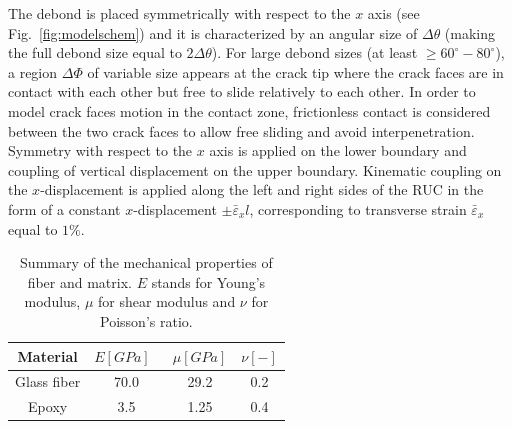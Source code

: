 \documentclass[review]{elsarticle}
\begin{document}
The debond is placed symmetrically with respect to the $x$ axis (see Fig.~\ref{fig:modelschem}) and it is characterized by an angular size of $\Delta\theta$ (making the full debond size equal to $2\Delta\theta$). For large debond sizes (at least $\geq 60^{\circ}-80^{\circ}$), a region $\Delta\Phi$ of variable size appears at the crack tip where the crack faces are in contact with each other but free to slide relatively to each other. In order to model crack faces motion in the contact zone, frictionless contact is considered between the two crack faces to allow free sliding and avoid interpenetration. Symmetry with respect to the $x$ axis is applied on the lower boundary and coupling of vertical displacement on the upper boundary. Kinematic coupling on the $x$-displacement is applied along the left and right sides of the RUC in the form of a constant $x$-displacement $\pm\bar{\varepsilon}_{x} l$, corresponding to transverse strain $\bar{\varepsilon}_{x}$ equal to $1\%$.

\begin{table}[!htbp]
 \centering
 \caption{Summary of the mechanical properties of fiber and matrix. $E$ stands for Young's modulus, $\mu$ for shear modulus and $\nu$ for Poisson's ratio.}
 \begin{tabular}{cccc}
\textbf{Material} & \textbf{$E\left[GPa\right]$}\ & \textbf{$\mu\left[GPa\right]$} & \textbf{$\nu\left[-\right]$} \\
\midrule
Glass fiber    & 70.0  & 29.2   & 0.2  \\
Epoxy    & 3.5    & 1.25   & 0.4
\end{tabular}
\label{tab:phaseprop}
\end{table}
\end{document}
